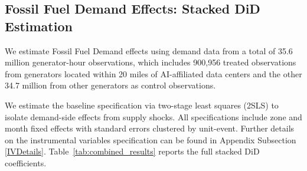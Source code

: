 \documentclass[a4paper,fleqn,longmktitle]{cas-sc}
\newcommand{\nb}[1]{\textcolor{blue}{NB[#1]}}
\begin{document}




\subsection{Fossil Fuel Demand Effects: Stacked DiD Estimation}

We estimate Fossil Fuel Demand effects using demand data from a total of 35.6 million generator-hour observations, which includes 900,956 treated observations from generators located within 20 miles of AI-affiliated data centers and the other 34.7 million from other generators as control observations.

We estimate the baseline specification via two-stage least squares (2SLS) to isolate demand-side effects from supply shocks. All specifications include zone and month fixed effects with standard errors clustered by unit-event. Further details on the instrumental variables specification can be found in Appendix Subsection \ref{IVDetails}. Table~\ref{tab:combined_results} reports the full stacked DiD coefficients.
\end{document}
